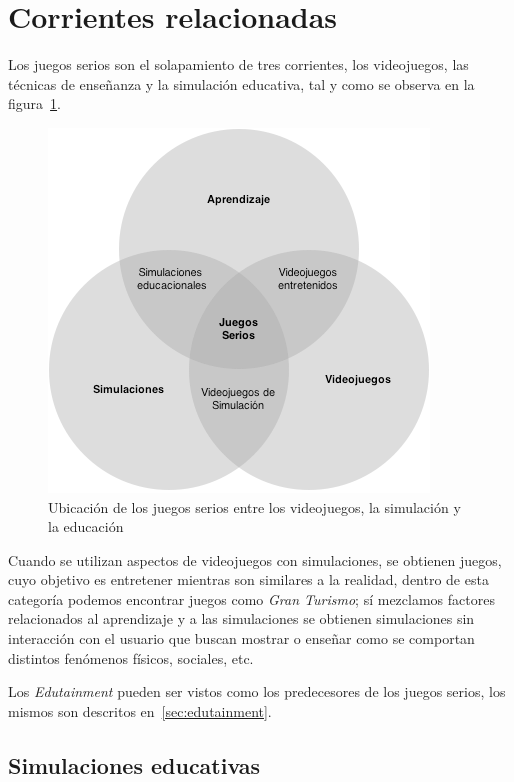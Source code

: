 \section{Corrientes relacionadas}

Los juegos serios son el solapamiento de tres corrientes, los videojuegos, las
técnicas de enseñanza y la simulación educativa\cite{education:games}, tal y
como se observa en la figura~\ref{fig:corrientes_relacionadas}. 

\begin{figure}[ht]
\centering
\includegraphics[scale=0.7]{juegos_serios/corrientes_paralelas.png}
\caption{Ubicación de los juegos serios entre los videojuegos, la simulación y
    la educación}
\label{fig:corrientes_relacionadas}
\end{figure}

Cuando se utilizan aspectos de videojuegos con simulaciones, se obtienen juegos, cuyo objetivo es entretener mientras son similares a la realidad, dentro de esta
categoría podemos encontrar juegos como \emph{Gran Turismo}; sí mezclamos
factores relacionados al aprendizaje y a las simulaciones se obtienen
simulaciones sin interacción con el usuario que buscan mostrar o enseñar como se
comportan distintos fenómenos físicos, sociales, etc.

Los \emph{Edutainment} pueden ser vistos como los predecesores de los juegos
serios, los mismos son descritos en~\ref{sec:edutainment}.

\subsection{Simulaciones educativas}



